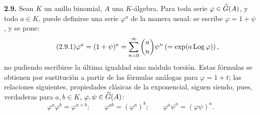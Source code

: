 \textbf{2.9.} Sean \(K\) un anillo binomial, \(A\) una \(K\)-álgebra. Para toda serie \(\varphi\in\Ghat(A)\), y todo \(a\in K\), puede definirse una serie \(\varphi^a\) de la manera usual: se escribe \(\varphi=1+\psi\), y se pone:
\begin{equation}\tag{2.9.1}
  \varphi^a=(1+\psi)^a
  =
  \sum_{n=0}^{\infty}\binom{a}{n}\psi^n
  \left(=\exp(a\Log\varphi)\right),
\end{equation}
no pudiendo escribirse la última igualdad sino módulo torsión. Estas fórmulas se obtienen por sustitución a partir de las fórmulas análogas para \(\varphi=1+t\); las relaciones siguientes, propiedades clásicas de la exponencial, siguen siendo, pues, verdaderas para \(a,b\in K\), \(\varphi,\psi\in\Ghat(A)\):
\begin{equation}\tag{2.9.2}
  \varphi^a\varphi^b=\varphi^{a+b};\qquad
  \varphi^{ab}=(\varphi^a)^b;\qquad
  \varphi^a\psi^a=(\varphi\psi)^a .
\end{equation}



\providecommand{\Ghat}{\widehat G}
\providecommand{\Gg}{\widehat G_g}
\providecommand{\Gcirc}{\widehat G_{\circ}}
\providecommand{\Gnabla}{\widehat G_{\nabla}}
\providecommand{\Grhat}{\widehat{\operatorname{Gr}}}
\providecommand{\Log}{\operatorname{Log}}
\providecommand{\Fil}{\operatorname{Fil}}
\providecommand{\eps}{\varepsilon}
\providecommand{\id}{\operatorname{id}}
\providecommand{\Sym}{\operatorname{Sym}}
\providecommand{\Mon}{\operatorname{Mon}}



